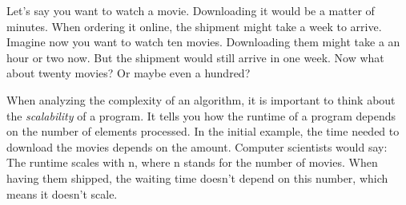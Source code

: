 
Let’s say you want to watch a movie. Downloading it would be a matter of minutes. When ordering it online, the shipment might take a week to arrive. Imagine now you want to watch ten movies. Downloading them might take a an hour or two now. But the shipment would still arrive in one week. Now what about twenty movies? Or maybe even a hundred?

When analyzing the complexity of an algorithm, it is important to think about the \emph{scalability} of a program. It tells you how the runtime of a program depends on the number of elements processed. In the initial example, the time needed to download the movies depends on the amount. Computer scientists would say: The runtime scales with n, where n stands for the number of movies. When having them shipped, the waiting time doesn’t depend on this number, which means it doesn't scale.
